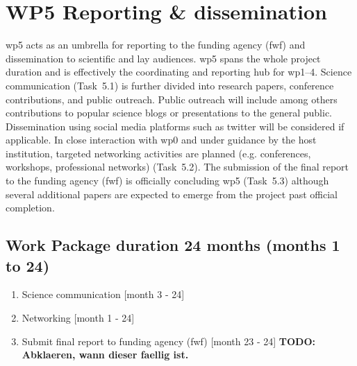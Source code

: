 \section{WP5 Reporting \& dissemination}
\label{sec:wp5}
\gls{wp}5 acts as an umbrella for reporting to the funding agency (\gls{fwf}) and dissemination to scientific and lay audiences. \gls{wp}5 spans the whole project duration and is effectively the coordinating and reporting hub for \gls{wp}1--4. Science communication (Task~5.1) is further divided into research papers, conference contributions, and public outreach. Public outreach will include among others contributions to popular science blogs or presentations to the general public. Dissemination using social media platforms such as twitter will be considered if applicable. In close interaction with \gls{wp}0 and under guidance by the host institution, targeted networking activities are planned (e.g. conferences, workshops, professional networks) (Task~5.2). The submission of the final report to the funding agency (\gls{fwf}) is officially concluding \gls{wp}5 (Task~5.3) although several additional papers are expected to emerge from the project past official completion.
{
\subsection*{Work Package duration 24 months (months 1 to 24)}
\begin{enumerate}[start=1,label={T5.\arabic*}]
  \itemsep0pt
\item Science communication \hfill [month 3 - 24]
\item Networking \hfill [month 1 - 24]
\item Submit final report to funding agency (\gls{fwf}) \hfill [month 23 - 24] \textbf{\color{red}TODO: Abklaeren, wann dieser faellig ist.}
\end{enumerate}
}
